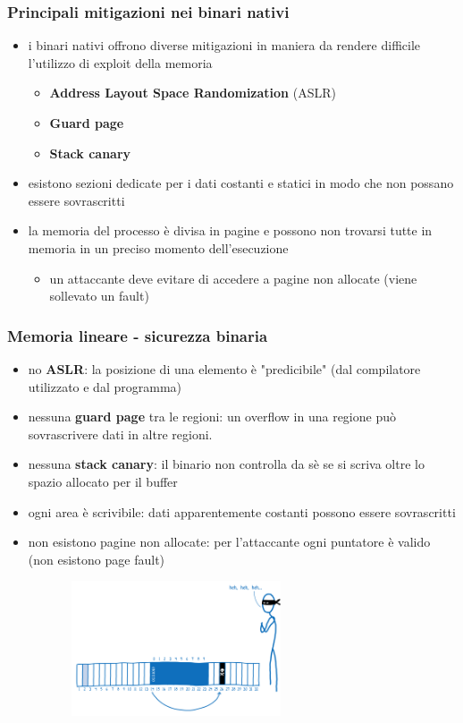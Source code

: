 \documentclass{beamer}
\begin{document}
\begin{frame}
  \frametitle{Principali mitigazioni nei binari nativi}
  \begin{itemize}
    \item i binari nativi offrono diverse mitigazioni in maniera da rendere
      difficile l'utilizzo di exploit della memoria
      \begin{itemize}
        \item \textbf{Address Layout Space Randomization} (ASLR)      
        \item \textbf{Guard page}        
        \item \textbf{Stack canary} 
      \end{itemize}
    \item esistono sezioni dedicate per i dati costanti e statici in modo che
      non possano essere sovrascritti
    \item la memoria del processo è divisa in pagine e possono non trovarsi tutte
      in memoria in un preciso momento dell'esecuzione
      \begin{itemize}
        \item un attaccante deve evitare di accedere a pagine non allocate
          (viene sollevato un fault)
      \end{itemize}
  \end{itemize}
\end{frame}

\begin{frame}
  \frametitle{Memoria lineare - sicurezza binaria}
  \begin{itemize}
    \item no \textbf{ASLR}: la posizione di una elemento è "predicibile" (dal
      compilatore utilizzato e dal programma)
    \item nessuna \textbf{guard page} tra le regioni: un overflow in una regione può sovrascrivere dati in
      altre regioni.
    \item nessuna \textbf{stack canary}: il binario non controlla da sè se si scriva
      oltre lo spazio
      allocato per il buffer
    \item ogni area è scrivibile: dati apparentemente costanti possono essere
      sovrascritti
    \item non esistono pagine non allocate: per l'attaccante ogni puntatore è valido (non
      esistono page fault)
  \end{itemize}

  \centerline{\includegraphics[width=10cm,height=4cm,keepaspectratio]{images/attack.png}}
\end{frame}
\end{document}
